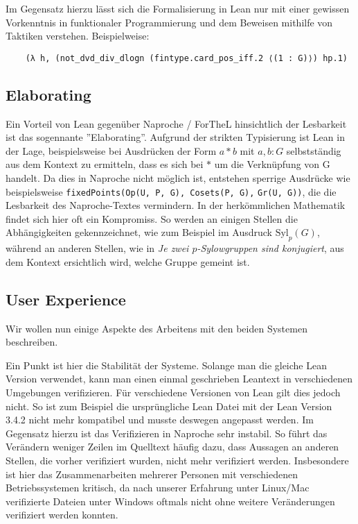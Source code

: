 \documentclass[a4paper,12pt]{scrartcl}
\begin{document}
\medskip

Im Gegensatz hierzu lässt sich die Formalisierung in Lean nur mit einer gewissen Vorkenntnis in funktionaler Programmierung und dem Beweisen mithilfe von Taktiken verstehen. Beispielweise:
\lstset{language=lean}
\begin{lstlisting}
    (λ h, (not_dvd_div_dlogn (fintype.card_pos_iff.2 ⟨(1 : G)⟩) hp.1) 
\end{lstlisting}

\subsection{Elaborating}

Ein Vorteil von Lean gegenüber Naproche / ForTheL hinsichtlich der Lesbarkeit ist das sogennante ''Elaborating''. Aufgrund der strikten Typisierung ist Lean in der Lage, beispielsweise bei Ausdrücken der Form $a * b$ mit $a, b : G$ selbstständig aus dem Kontext zu ermitteln, dass es sich bei $*$ um die Verknüpfung von G handelt. Da dies in Naproche nicht möglich ist, entstehen sperrige Ausdrücke wie beispielsweise \verb!fixedPoints(Op(U, P, G), Cosets(P, G),! \verb!Gr(U, G))!, die die Lesbarkeit des Naproche-Textes vermindern.
In der herkömmlichen Mathematik findet sich hier oft ein Kompromiss. So werden an einigen Stellen die Abhängigkeiten gekennzeichnet, wie zum Beispiel im Ausdruck $\text{Syl}_{p}(G)$, während an anderen Stellen, wie in \textit{Je zwei $p$-Sylowgruppen sind konjugiert}, aus dem Kontext ersichtlich wird, welche Gruppe gemeint ist.

\subsection{User Experience}

Wir wollen nun einige Aspekte des Arbeitens mit den beiden Systemen beschreiben.

Ein Punkt ist hier die Stabilität der Systeme. Solange man die gleiche Lean Version verwendet, kann man einen einmal geschrieben Leantext in verschiedenen Umgebungen verifizieren. Für verschiedene Versionen von Lean gilt dies jedoch nicht. So ist zum Beispiel die ursprüngliche Lean Datei \cite{bibtex.c} mit der Lean Version 3.4.2 nicht mehr kompatibel und musste deswegen angepasst werden.
Im Gegensatz hierzu ist das Verifizieren in Naproche sehr instabil. So führt das Verändern weniger Zeilen im Quelltext häufig dazu, dass Aussagen an anderen Stellen, die vorher verifiziert wurden, nicht mehr verifiziert werden. Insbesondere ist hier das Zusammenarbeiten mehrerer Personen mit verschiedenen Betriebssystemen kritisch, da nach unserer Erfahrung unter Linux/Mac verifizierte Dateien unter Windows oftmals nicht ohne weitere Veränderungen verifiziert werden konnten. 
\end{document}
